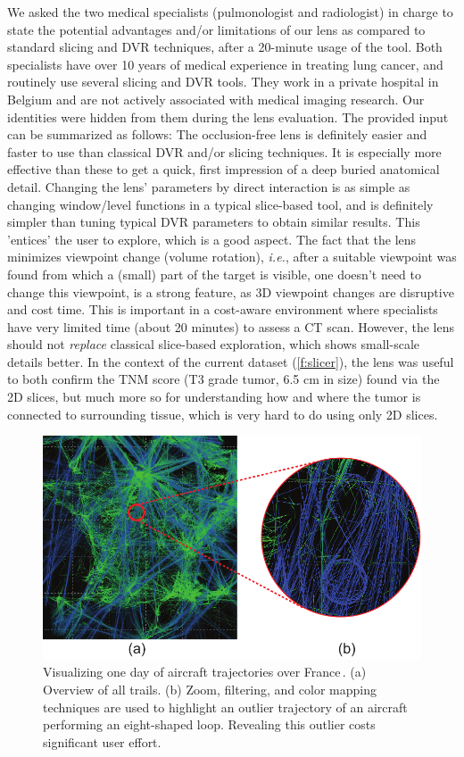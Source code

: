 We asked the two medical specialists (pulmonologist and radiologist) in charge to state the potential advantages and/or limitations of our lens as compared to standard slicing and DVR techniques, after a 20-minute usage of the tool. 
Both specialists have over 10 years of medical experience in treating lung cancer, and routinely use several slicing and DVR tools. They work in a private hospital in Belgium and are not actively associated with medical imaging research. Our identities were hidden from them during the lens evaluation. The provided input can be summarized as follows: The occlusion-free lens is definitely easier and faster to use than classical DVR and/or slicing techniques. It is especially more effective than these to get a quick, first impression of a deep buried anatomical detail. Changing the lens' parameters by direct interaction is as simple as changing window/level functions in a typical slice-based tool, and is definitely simpler than tuning typical DVR parameters to obtain similar results. This 'entices' the user to explore, which is a good aspect. The fact that the lens minimizes viewpoint change (volume rotation), \emph{i.e.}, after a suitable viewpoint was found from which a (small) part of the target is visible, one doesn't need to change this viewpoint, is a strong feature, as 3D viewpoint changes are disruptive and cost time. This is important in a cost-aware environment where specialists have very limited time (about 20 minutes) to assess a CT scan. However, the lens should not \emph{replace} classical slice-based exploration, which shows small-scale details better. In the context of the current dataset (\autoref{f:slicer}), the lens was useful to both confirm the TNM score (T3 grade tumor, 6.5 cm in size) found via the 2D slices, but much more so for understanding how and where the tumor is connected to surrounding tissue, which is very hard to do using only 2D slices.

\begin{figure}
\centering
\includegraphics [width=\textwidth]{images/aircraft.pdf}

\caption{Visualizing one day of aircraft trajectories over France\,\cite{hurter2009fromdady}. (a) Overview of all trails. (b) Zoom, filtering, and color mapping techniques are used to highlight an outlier trajectory of an aircraft performing an eight-shaped loop. Revealing this outlier costs significant user effort.}
\label{f:fromdady}

\end{figure}


